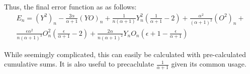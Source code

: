 \documentclass{article}
\begin{document}
Thus, the final error function as as follows: \[
    \begin{split}
        E_n = (Y^2)_n - \frac{2\alpha}{\alpha + 1}(YO)_n + \frac{1}{n(\alpha + 1)} Y^2_n \left( \frac{1}{\alpha + 1} - 2\right) + \frac{\alpha^2}{(\alpha + 1)^2} (O^2)_n + \\
    \frac{\epsilon \alpha^2}{n(\alpha + 1)^3} O_n^2 \left( \frac{\epsilon}{\alpha + 1} - 2 \right) + \frac{2\alpha}{n(\alpha + 1)^2}Y_nO_n \left(\epsilon + 1 - \frac{\epsilon}{\alpha + 1} \right)
    \end{split}
\]

While seemingly complicated, this can easily be calculated with pre-calculated cumulative sums. It is also useful to precaclulate $\frac{1}{\alpha + 1}$ given its common usage.
\end{document}
